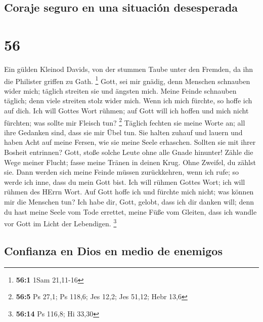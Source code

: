 \hypertarget{coraje-seguro-en-una-situaciuxf3n-desesperada}{%
\subsection{Coraje seguro en una situación
desesperada}\label{coraje-seguro-en-una-situaciuxf3n-desesperada}}

\hypertarget{section-55}{%
\section{56}\label{section-55}}

 Ein gülden Kleinod Davids, von der stummen Taube unter
den Fremden, da ihn die Philister griffen zu Gath. \footnote{\textbf{56:1}
  1Sam 21,11-16}  Gott, sei mir gnädig, denn Menschen
schnauben wider mich; täglich streiten sie und ängsten mich.
 Meine Feinde schnauben täglich; denn viele streiten stolz
wider mich.  Wenn ich mich fürchte, so hoffe ich auf dich.
 Ich will Gottes Wort rühmen; auf Gott will ich hoffen und
mich nicht fürchten; was sollte mir Fleisch tun? \footnote{\textbf{56:5}
  Ps 27,1; Ps 118,6; Jes 12,2; Jes 51,12; Hebr 13,6} 
Täglich fechten sie meine Worte an; all ihre Gedanken sind, dass sie mir
Übel tun.  Sie halten zuhauf und lauern und haben Acht auf
meine Fersen, wie sie meine Seele erhaschen.  Sollten sie
mit ihrer Bosheit entrinnen? Gott, stoße solche Leute ohne alle Gnade
hinunter!  Zähle die Wege meiner Flucht; fasse meine
Tränen in deinen Krug. Ohne Zweifel, du zählst sie.  Dann
werden sich meine Feinde müssen zurückkehren, wenn ich rufe; so werde
ich inne, dass du mein Gott bist.  Ich will rühmen Gottes
Wort; ich will rühmen des HErrn Wort.  Auf Gott hoffe ich
und fürchte mich nicht; was können mir die Menschen tun? 
Ich habe dir, Gott, gelobt, dass ich dir danken will; 
denn du hast meine Seele vom Tode errettet, meine Füße vom Gleiten, dass
ich wandle vor Gott im Licht der Lebendigen. \footnote{\textbf{56:14} Ps
  116,8; Hi 33,30}

\hypertarget{confianza-en-dios-en-medio-de-enemigos}{%
\subsection{Confianza en Dios en medio de
enemigos}\label{confianza-en-dios-en-medio-de-enemigos}}

